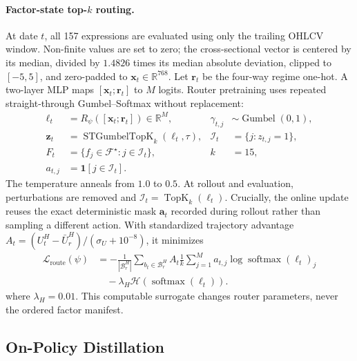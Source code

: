 \paragraph{Factor-state top-$k$ routing.}
At date $t$, all 157 expressions are evaluated using only the trailing OHLCV window. Non-finite values are set to zero; the cross-sectional vector is centered by its median, divided by $1.4826$ times its median absolute deviation, clipped to $[-5,5]$, and zero-padded to $\mathbf x_t\in\mathbb R^{768}$. Let $\mathbf r_t$ be the four-way regime one-hot. A two-layer MLP maps $[\mathbf x_t;\mathbf r_t]$ to $M$ logits. Router pretraining uses repeated straight-through Gumbel--Softmax without replacement:
\begin{equation}
\label{eq:gumbel}
\begin{aligned}
\boldsymbol\ell_t&=R_{\psi}([\mathbf x_t;\mathbf r_t])\in\mathbb R^M,
&\gamma_{t,j}&\sim\operatorname{Gumbel}(0,1),\\
\mathbf z_t&=\operatorname{STGumbelTopK}_k(
\boldsymbol\ell_t,\tau),
&\mathcal I_t&=\{j:z_{t,j}=1\},\\
F_t&=\{f_j\in\mathcal F^\star:j\in\mathcal I_t\},
&k&=15,\\
a_{t,j}&=\mathbf 1[j\in\mathcal I_t].
\end{aligned}
\end{equation}
The temperature anneals from $1.0$ to $0.5$. At rollout and evaluation, perturbations are removed and $\mathcal I_t=\operatorname{TopK}_k(\boldsymbol\ell_t)$. Crucially, the online update reuses the exact deterministic mask $\mathbf a_t$ recorded during rollout rather than sampling a different action. With standardized trajectory advantage $A_t=(U_t^H-\bar U_r^H)/(\sigma_U+10^{-8})$, it minimizes
\begin{equation}
\label{eq:router_loss}
\begin{aligned}
\mathcal L_{\mathrm{route}}(\psi)&=
-\frac{1}{|\mathcal B_r^H|}\sum_{b_t\in\mathcal B_r^H}
A_t\frac{1}{k}\sum_{j=1}^{M}
a_{t,j}\log\operatorname{softmax}(\boldsymbol\ell_t)_j\\
&\quad-\lambda_H\mathcal H(\operatorname{softmax}(\boldsymbol\ell_t)).
\end{aligned}
\end{equation}
where $\lambda_H=0.01$. This computable surrogate changes router parameters, never the ordered factor manifest.

\subsection{On-Policy Distillation}
\label{sec:opd}

